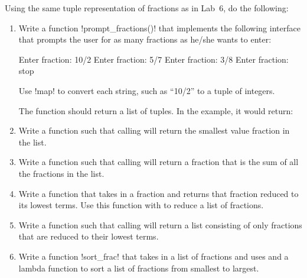 \documentclass[11pt]{cselabheader}
\begin{document}
\begin{ex}[fractions2.py] Using the same tuple representation of fractions as in
    Lab~6, do the following:

    \begin{enumerate}
      \item Write a function \pythoninline!prompt_fractions()! that implements the
        following interface that prompts the user for as many fractions as
        he/she wants to enter:

        \begin{verbatimcode}
Enter fraction: 10/2
Enter fraction: 5/7
Enter fraction: 3/8
Enter fraction: stop
        \end{verbatimcode}

        Use \pythoninline!map! to convert each string, such as ``10/2'' to a
        tuple of integers.

        The function should return a list of tuples. In the example, it would
        return:
        \begin{python3code}
[(10, 2), (5, 7), (3, 8)]
        \end{python3code}

      \item Write a function  such that calling
         will return
        the smallest value fraction in the list.
      \item Write a function  such that calling
         will return
        a fraction that is the sum of all the fractions in the list.
      \item Write a function  that takes in a fraction
        and returns that fraction reduced to its lowest terms. Use this function
        with  to reduce a list of fractions.
      \item Write a function  such that calling
         will return a list consisting
        of only fractions that are reduced to their lowest terms.
      \item Write a function \pythoninline!sort_frac! that takes in a list of
        fractions and uses 
        and a lambda  function to sort a list of fractions from
        smallest to largest.
    \end{enumerate}


\end{ex}
\end{document}
